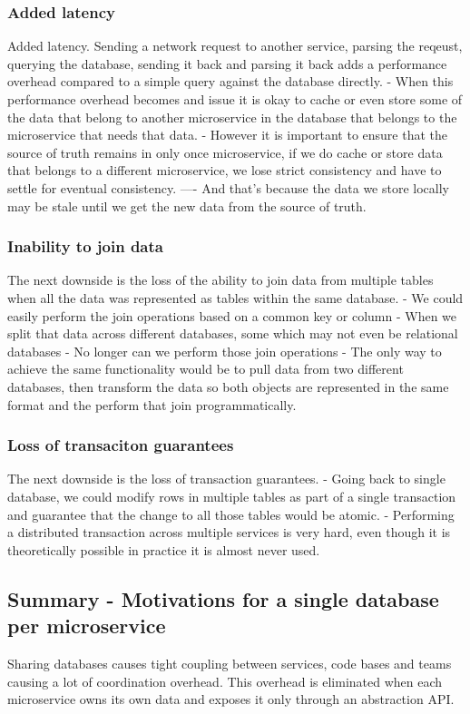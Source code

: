 \documentclass[a4paper, 11pt]{book}
\begin{document}
    \subsubsection{Added latency}
    Added latency.
    Sending a network request to another service, parsing the reqeust, querying the database, sending it back and parsing it back
    adds a performance overhead compared to a simple query against the database directly.
    - When this performance overhead becomes and issue it is okay to cache or even store some of the data that belong to another microservice in the database that belongs to the microservice that needs that data.
    - However it is important to ensure that the source of truth remains in only once microservice, if we do cache or store data that belongs to a different microservice, we lose strict consistency and have to settle for eventual consistency.
    ---- And that's because the data we store locally may be stale until we get the new data from the source of truth.

    \subsubsection{Inability to join data}
    The next downside is the loss of the ability to join data from multiple tables when all the data was represented as tables within the same database.
    - We could easily perform the join operations based on a common key or column
    - When we split that data across different databases, some which may not even be relational databases
    - No longer can we perform those join operations
    - The only way to achieve the same functionality would be to pull data from two different databases, then transform the data so both objects are represented in the same format and the perform that join programmatically.

    \subsubsection{Loss of transaciton guarantees}
    The next downside is the loss of transaction guarantees.
    - Going back to single database, we could modify rows in multiple tables as part of a single transaction and guarantee that the change to all those tables would be atomic.
    - Performing a distributed transaction across multiple services is very hard, even though it is theoretically possible in practice it is almost never used.

    \subsection{Summary - Motivations for a single database per microservice}
    Sharing databases causes tight coupling between services, code bases and teams causing a lot of coordination overhead.
    This overhead is eliminated when each microservice owns its own data and exposes it only through an abstraction API.
\end{document}
